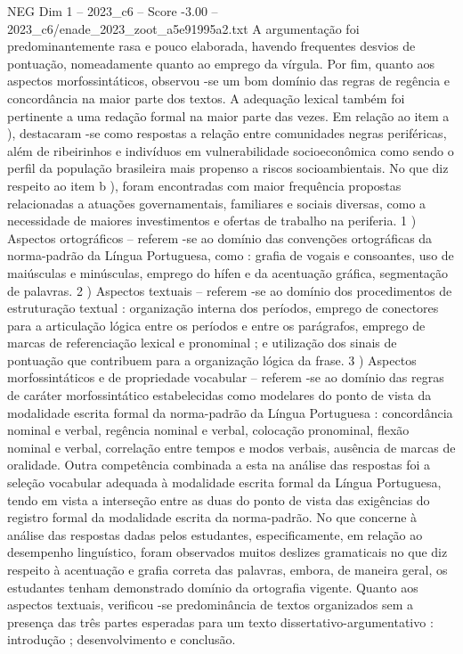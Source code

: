 \begin{textsample}{NEG Dim 1 – 2023\_c6 – Score -3.00 – 2023\_c6/enade\_2023\_zoot\_a5e91995a2.txt}
A argumentação foi predominantemente rasa e pouco elaborada, havendo frequentes desvios de pontuação, nomeadamente quanto ao emprego da vírgula.
Por fim, quanto aos aspectos morfossintáticos, observou -se um bom domínio das regras de regência e concordância na maior parte dos textos.
A adequação lexical também foi pertinente a uma redação formal na maior parte das vezes.
Em relação ao item a ), destacaram -se como respostas a relação entre comunidades negras periféricas, além de ribeirinhos e indivíduos em vulnerabilidade socioeconômica como sendo o perfil da população brasileira mais propenso a riscos socioambientais.
No que diz respeito ao item b ), foram encontradas com maior frequência propostas relacionadas a atuações governamentais, familiares e sociais diversas, como a necessidade de maiores investimentos e ofertas de trabalho na periferia. 1 ) Aspectos ortográficos – referem -se ao domínio das convenções ortográficas da norma-padrão da Língua Portuguesa, como : grafia de vogais e consoantes, uso de maiúsculas e minúsculas, emprego do hífen e da acentuação gráfica, segmentação de palavras. 2 ) Aspectos textuais – referem -se ao domínio dos procedimentos de estruturação textual : organização interna dos períodos, emprego de conectores para a articulação lógica entre os períodos e entre os parágrafos, emprego de marcas de referenciação lexical e pronominal ; e utilização dos sinais de pontuação que contribuem para a organização lógica da frase. 3 ) Aspectos morfossintáticos e de propriedade vocabular – referem -se ao domínio das regras de caráter morfossintático estabelecidas como modelares do ponto de vista da modalidade escrita formal da norma-padrão da Língua Portuguesa : concordância nominal e verbal, regência nominal e verbal, colocação pronominal, flexão nominal e verbal, correlação entre tempos e modos verbais, ausência de marcas de oralidade.
Outra competência combinada a esta na análise das respostas foi a seleção vocabular adequada à modalidade escrita formal da Língua Portuguesa, tendo em vista a interseção entre as duas do ponto de vista das exigências do registro formal da modalidade escrita da norma-padrão.
No que concerne à análise das respostas dadas pelos estudantes, especificamente, em relação ao desempenho linguístico, foram observados muitos deslizes gramaticais no que diz respeito à acentuação e grafia correta das palavras, embora, de maneira geral, os estudantes tenham demonstrado domínio da ortografia vigente.
Quanto aos aspectos textuais, verificou -se predominância de textos organizados sem a presença das três partes esperadas para um texto dissertativo-argumentativo : introdução ; desenvolvimento e conclusão.

\end{textsample}
